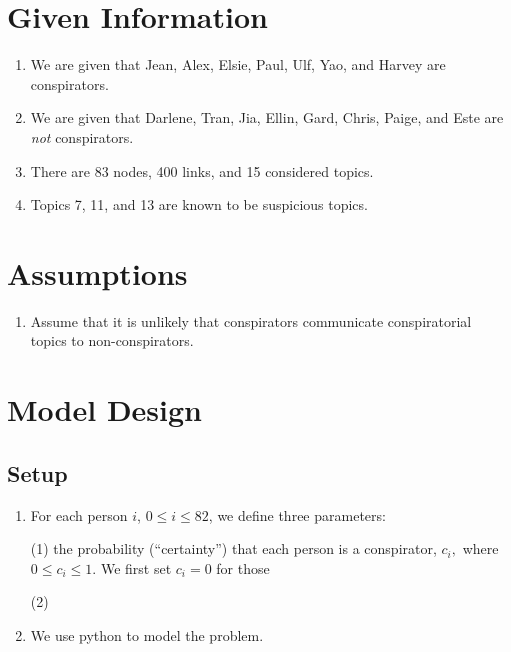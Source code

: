 \documentclass{icmmcm}
\begin{document}
\section{Given Information}
\begin{enumerate}
\item We are given that Jean, Alex, Elsie, Paul, Ulf, Yao,
and Harvey are conspirators.
\item We are given that Darlene, Tran, Jia, Ellin, Gard, Chris,
Paige, and Este are \textit{not} conspirators.
\item There are 83 nodes, 400 links, and 15 considered topics.
\item Topics 7, 11, and 13 are known to be suspicious topics.
\end{enumerate}

\section{Assumptions}

\begin{enumerate}
\item Assume that it is unlikely that conspirators communicate
conspiratorial topics to non-conspirators.
\end{enumerate}
\section{Model Design}

\subsection{Setup}
\begin{enumerate}
\item For each person $i$, $0\leq i\leq 82$, we define three parameters: 

\quad (1) the probability (``certainty'')
that each person is a conspirator, $c_i,$
where $0\leq c_i \leq 1.$ 
We first set $c_i = 0$ for those

\quad (2) 

\item We use python to model the problem.
\end{enumerate}
\end{document}
